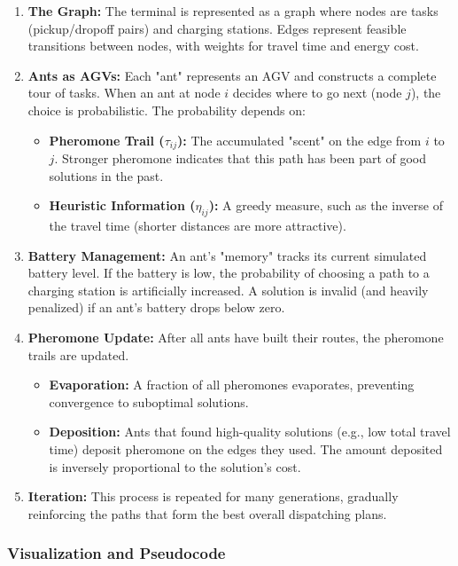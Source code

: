 \documentclass{article}
\begin{document}
\begin{enumerate}
    \item \textbf{The Graph:} The terminal is represented as a graph where nodes are tasks (pickup/dropoff pairs) and charging stations. Edges represent feasible transitions between nodes, with weights for travel time and energy cost.
    \item \textbf{Ants as AGVs:} Each "ant" represents an AGV and constructs a complete tour of tasks. When an ant at node $i$ decides where to go next (node $j$), the choice is probabilistic. The probability depends on:
    \begin{itemize}
        \item \textbf{Pheromone Trail ($\tau_{ij}$):} The accumulated "scent" on the edge from $i$ to $j$. Stronger pheromone indicates that this path has been part of good solutions in the past.
        \item \textbf{Heuristic Information ($\eta_{ij}$):} A greedy measure, such as the inverse of the travel time (shorter distances are more attractive).
    \end{itemize}
    \item \textbf{Battery Management:} An ant's "memory" tracks its current simulated battery level. If the battery is low, the probability of choosing a path to a charging station is artificially increased. A solution is invalid (and heavily penalized) if an ant's battery drops below zero.
    \item \textbf{Pheromone Update:} After all ants have built their routes, the pheromone trails are updated.
    \begin{itemize}
        \item \textbf{Evaporation:} A fraction of all pheromones evaporates, preventing convergence to suboptimal solutions.
        \item \textbf{Deposition:} Ants that found high-quality solutions (e.g., low total travel time) deposit pheromone on the edges they used. The amount deposited is inversely proportional to the solution's cost.
    \end{itemize}
    \item \textbf{Iteration:} This process is repeated for many generations, gradually reinforcing the paths that form the best overall dispatching plans.
\end{enumerate}

\subsubsection*{Visualization and Pseudocode}
\end{document}
